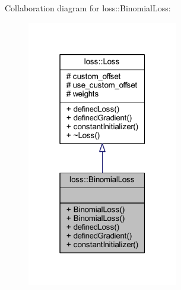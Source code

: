 Collaboration diagram for loss\+:\+:Binomial\+Loss\+:\nopagebreak
\begin{figure}[H]
\begin{center}
\leavevmode
\includegraphics[width=187pt]{classloss_1_1_binomial_loss__coll__graph}
\end{center}
\end{figure}
